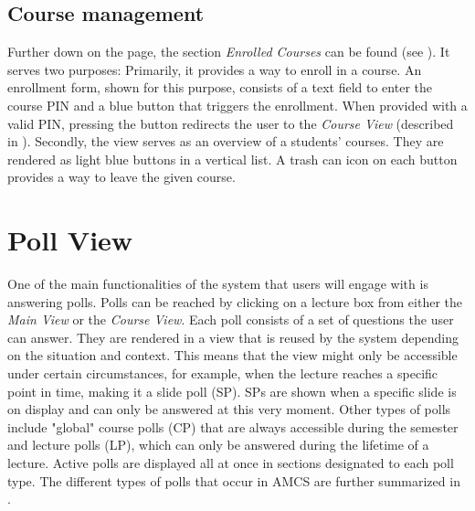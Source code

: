 

\subsection{Course management}

Further down on the page, the section \emph{Enrolled Courses} can be found (see ). It serves two purposes: Primarily, it provides a way to enroll in a course. An enrollment form, shown for this purpose, consists of a text field to enter the course PIN and a blue button that triggers the enrollment. When provided with a valid PIN, pressing the button redirects the user to the \emph{Course View} (described in ).
Secondly, the view serves as an overview of a students' courses. They are rendered as light blue buttons in a vertical list. A trash can icon on each button provides a way to leave the given course.

\section{Poll View}
\label{section:soa:pollview}
One of the main functionalities of the system that users will engage with is answering polls.
Polls can be reached by clicking on a lecture box from either the \emph{Main View} or the \emph{Course View}.
Each poll consists of a set of questions the user can answer. They are rendered in a view that is reused by the system depending on the situation and context. This means that the view might only be accessible under certain circumstances, for example, when the lecture reaches a specific point in time, making it a slide poll (SP). SPs are shown when a specific slide is on display and can only be answered at this very moment. Other types of polls include "global" course polls (CP) that are always accessible during the semester and lecture polls (LP), which can only be answered during the lifetime of a lecture.
Active polls are displayed all at once in sections designated to each poll type.
The different types of polls that occur in AMCS are further summarized in .

